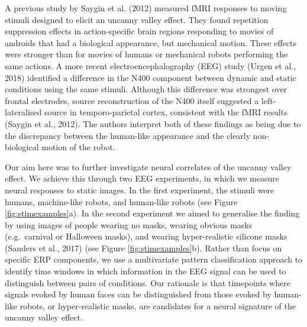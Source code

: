 \documentclass[
]{article}
\begin{document}
A previous study by Saygin et al. (2012) measured fMRI responses to moving stimuli designed to elicit an uncanny valley effect. They found repetition suppression effects in action-specific brain regions responding to movies of androids that had a biological appearance, but mechanical motion. These effects were stronger than for movies of humans or mechanical robots performing the same actions. A more recent electroencephalography (EEG) study (Urgen et al., 2018) identified a difference in the N400 component between dynamic and static conditions using the same stimuli. Although this difference was strongest over frontal electrodes, source reconstruction of the N400 itself suggested a left-lateralised source in temporo-parietal cortex, consistent with the fMRI results (Saygin et al., 2012). The authors interpret both of these findings as being due to the discrepancy between the human-like appearance and the clearly non-biological motion of the robot.

Our aim here was to further investigate neural correlates of the uncanny valley effect. We achieve this through two EEG experiments, in which we measure neural responses to static images. In the first experiment, the stimuli were humans, machine-like robots, and human-like robots (see Figure \ref{fig:stimexamples}a). In the second experiment we aimed to generalise the finding by using images of people wearing no masks, wearing obvious masks (e.g.~carnival or Halloween masks), and wearing hyper-realistic silicone masks (Sanders et al., 2017) (see Figure \ref{fig:stimexamples}b). Rather than focus on specific ERP components, we use a multivariate pattern classification approach to identify time windows in which information in the EEG signal can be used to distinguish between pairs of conditions. Our rationale is that timepoints where signals evoked by human faces can be distinguished from those evoked by human-like robots, or hyper-realistic masks, are candidates for a neural signature of the uncanny valley effect.
\end{document}

